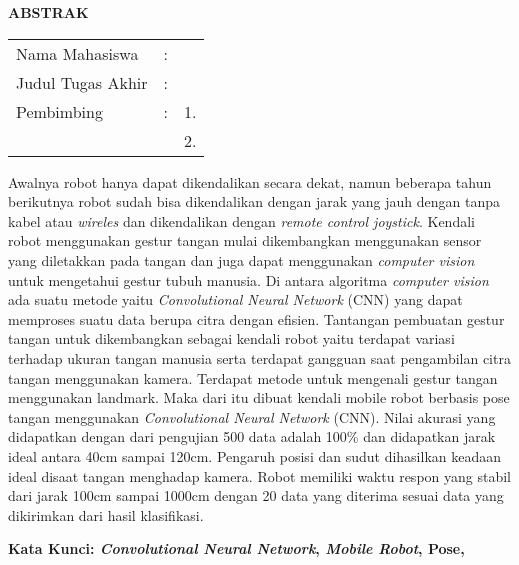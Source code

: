 \begin{center}
  \large\textbf{ABSTRAK}
\end{center}


\vspace{2ex}

\begingroup
\setlength{\tabcolsep}{0pt}

\noindent
\begin{tabularx}{\textwidth}{l >{\centering}m{2em} X}
  Nama Mahasiswa    & : & \name{}         \\

  Judul Tugas Akhir & : & \tatitle{}      \\

  Pembimbing        & : & 1. \advisor{}   \\
                    &   & 2. \coadvisor{} \\
\end{tabularx}
\endgroup

Awalnya robot hanya dapat dikendalikan secara dekat, namun beberapa tahun berikutnya robot sudah bisa dikendalikan dengan jarak yang jauh dengan tanpa kabel atau \textit{wireles} dan dikendalikan dengan \textit{remote control joystick}. Kendali robot menggunakan gestur tangan mulai dikembangkan menggunakan sensor yang diletakkan pada tangan dan juga dapat menggunakan \textit{computer vision} untuk mengetahui gestur tubuh manusia. Di antara algoritma \textit{computer vision} ada suatu metode yaitu \textit{Convolutional Neural Network} (CNN) yang dapat memproses suatu data berupa citra dengan efisien. Tantangan pembuatan gestur tangan untuk dikembangkan sebagai kendali robot yaitu terdapat variasi terhadap ukuran tangan manusia serta terdapat gangguan saat pengambilan citra tangan menggunakan kamera. Terdapat metode untuk mengenali gestur tangan menggunakan landmark. Maka dari itu dibuat kendali mobile robot berbasis pose tangan menggunakan \textit{Convolutional Neural Network} (CNN). Nilai akurasi yang didapatkan dengan dari pengujian 500 data adalah 100\% dan didapatkan jarak ideal antara 40cm sampai 120cm. Pengaruh posisi dan sudut dihasilkan keadaan ideal disaat tangan menghadap kamera. Robot memiliki waktu respon yang stabil dari jarak 100cm sampai 1000cm dengan 20 data yang diterima sesuai data yang dikirimkan dari hasil klasifikasi.

\vspace{2ex}
\noindent
\textbf{Kata Kunci: \textit{Convolutional Neural Network}, \emph{Mobile Robot}, Pose,}
